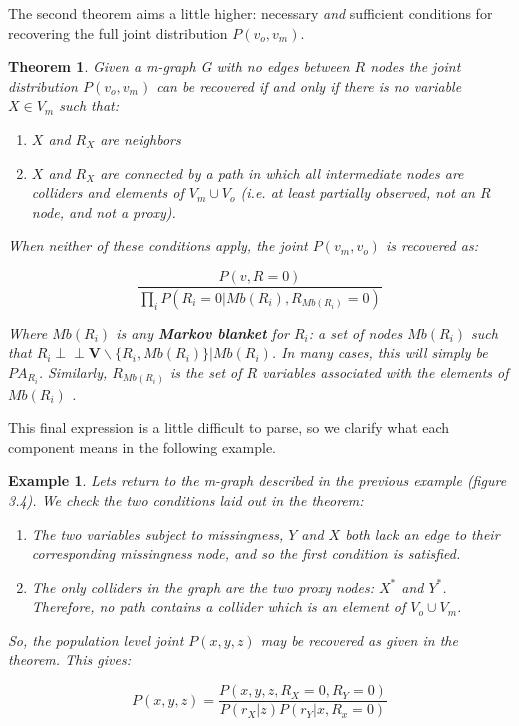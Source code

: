 \documentclass[12pt,twoside]{reedthesis}
\newtheorem{theorem}{Theorem}
\newtheorem{example}{Example}
\theoremstyle{definition}
\newcommand{\dsep}{\perp \!\!\!\perp}
\begin{document}
The second theorem aims a little higher: necessary \emph{and} sufficient conditions for recovering the full joint distribution $P(v_o, v_m)$.

\begin{theorem}
Given a m-graph G with no edges between $R$ nodes the joint distribution $P(v_o, v_m)$ can be recovered if and only if there is no variable $X \in V_m$ such that:
\begin{enumerate}
\item $X$ and $R_X$ are neighbors

\item $X$ and $R_X$ are connected by a path in which all intermediate nodes are colliders and elements of $V_m \cup V_o$ (i.e. at least partially observed, not an $R$ node, and not a proxy).
\end{enumerate}

When neither of these conditions apply, the joint $P(v_m, v_o)$ is recovered as:

$$\frac{P(v, R=0)}{\prod_i P(R_i = 0 | Mb(R_i), R_{Mb(R_i)} = 0)}$$

Where $Mb(R_i)$ is any \textbf{Markov blanket} for $R_i$: a set of nodes $Mb(R_i)$ such that \newline $R_i \dsep \mathbf{V} \backslash \{R_i, Mb(R_i)\} | Mb(R_i)$. In many cases, this will simply be $PA_{R_i}$. Similarly, $R_{Mb(R_i)}$ is the set of $R$ variables associated with the elements of $Mb(R_i)$ \citep{Mohan_2019}.
\end{theorem}

This final expression is a little difficult to parse, so we clarify what each component means in the following example.
\begin{example}
Lets return to the m-graph described in the previous example (figure 3.4). We check the two conditions laid out in the theorem:

\begin{enumerate}
\item The two variables subject to missingness, $Y$ and $X$ both lack an edge to their corresponding missingness node, and so the first condition is satisfied.

\item The only colliders in the graph are the two proxy nodes: $X^*$ and $Y^*$. Therefore, no path contains a collider which is an element of $V_o \cup V_m$.
\end{enumerate}

So, the population level joint $P(x,y,z)$ may be recovered as given in the theorem. This gives:

$$P(x,y,z) = \frac{P(x,y,z, R_X = 0, R_Y = 0)}{P(r_X | z)P(r_Y | x, R_x = 0)}$$
\end{example}
\end{document}
